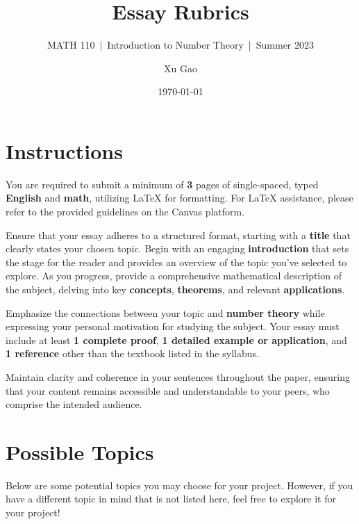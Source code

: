 \documentclass[11pt]{article}
\title{Essay Rubrics}
\author{Xu Gao}
\subtitle{MATH 110~|~Introduction to Number Theory~|~Summer 2023}
\date{\today}
\theoremstyle{plain}
\theoremstyle{definition}
\theoremstyle{remark}
\numberwithin{equation}{section}
\begin{document}
\maketitle

\section*{Instructions}
You are required to submit a minimum of \textbf{3} pages of single-spaced, typed \textbf{English} and \textbf{math}, utilizing \LaTeX{} for formatting. For \LaTeX{} assistance, please refer to the provided guidelines on the Canvas platform.

Ensure that your essay adheres to a structured format, starting with a \textbf{title} that clearly states your chosen topic. Begin with an engaging \textbf{introduction} that sets the stage for the reader and provides an overview of the topic you've selected to explore. As you progress, provide a comprehensive mathematical description of the subject, delving into key \textbf{concepts}, \textbf{theorems}, and relevant \textbf{applications}.

Emphasize the connections between your topic and \textbf{number theory} while expressing your personal motivation for studying the subject. Your essay must include at least \textbf{1 complete proof}, \textbf{1 detailed example or application}, and \textbf{1 reference} other than the textbook listed in the syllabus.

Maintain clarity and coherence in your sentences throughout the paper, ensuring that your content remains accessible and understandable to your peers, who comprise the intended audience.

\section*{Possible Topics}
Below are some potential topics you may choose for your project. However, if you have a different topic in mind that is not listed here, feel free to explore it for your project! 

\end{document}
